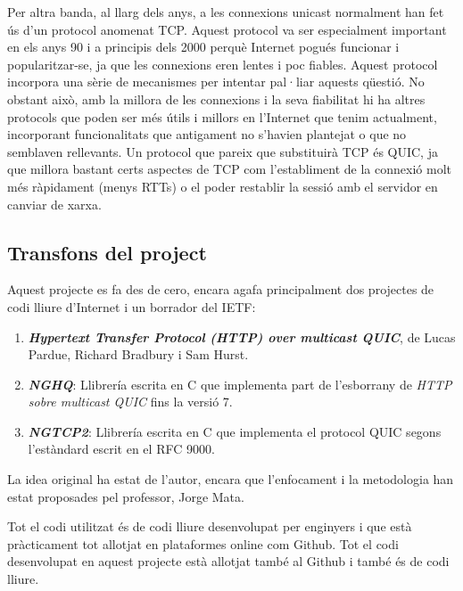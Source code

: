 {    Per altra banda, al llarg dels anys, a les connexions unicast normalment han fet ús d'un protocol anomenat \ac{TCP}. Aquest protocol va ser especialment
    important en els anys 90 i a principis dels 2000 perquè Internet pogués funcionar i popularitzar-se, ja que les connexions eren lentes i poc fiables.
    Aquest protocol incorpora una sèrie de mecanismes per intentar pal·liar aquests qüestió. No obstant això, amb la millora de les connexions i la seva fiabilitat
    hi ha altres protocols que poden ser més útils i millors en l'Internet que tenim actualment, incorporant funcionalitats que antigament no s'havien plantejat
    o que no semblaven rellevants. Un protocol que pareix que substituirà \ac{TCP} és QUIC, ja que millora bastant certs aspectes de TCP com l'establiment
    de la connexió molt més ràpidament (menys RTTs) o el poder restablir la sessió amb el servidor en canviar de xarxa.

}

\subsection{Transfons del project}
{
    Aquest projecte es fa des de cero, encara agafa principalment dos projectes de codi lliure d'Internet i un borrador del \ac{IETF}:

    \begin{enumerate}
        \item{\textbf{\textit{Hypertext Transfer Protocol (\ac{HTTP}) over multicast QUIC}}, de Lucas Pardue, Richard Bradbury i Sam Hurst.}
        \item{\textbf{\textit{NGHQ}}: Llibrería escrita en C que implementa part de l'esborrany de \textit{\ac{HTTP} sobre multicast QUIC} fins la versió 7.}
        \item{\textbf{\textit{NGTCP2}}: Llibrería escrita en C que implementa el protocol QUIC segons l'estàndard escrit en el \ac{RFC} 9000.}
    \end{enumerate}

    La idea original ha estat de l'autor, encara que l'enfocament i la metodologia han estat proposades pel professor, Jorge Mata.

    Tot el codi utilitzat és de codi lliure desenvolupat per enginyers i que està pràcticament tot allotjat en plataformes
    online com Github. Tot el codi desenvolupat en aquest projecte està allotjat també al Github i també és de codi lliure.
}

